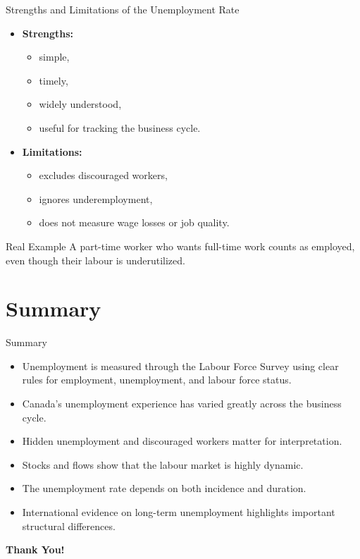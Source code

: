 \documentclass[aspectratio=169]{beamer}
\begin{document}
\begin{frame}{Strengths and Limitations of the Unemployment Rate}
\transfade
\begin{itemize}[<+->]
  \item \textbf{Strengths:}
  \begin{itemize}[<+->]
    \item simple,
    \item timely,
    \item widely understood,
    \item useful for tracking the business cycle.
  \end{itemize}
  \item \textbf{Limitations:}
  \begin{itemize}[<+->]
    \item excludes discouraged workers,
    \item ignores underemployment,
    \item does not measure wage losses or job quality.
  \end{itemize}
\end{itemize}

\begin{exampleblock}{Real Example}
A part-time worker who wants full-time work counts as employed, even though their labour is underutilized.
\end{exampleblock}
\end{frame}

\section{Summary}

\begin{frame}{Summary}
\transfade
\begin{itemize}[<+->]
  \item Unemployment is measured through the Labour Force Survey using clear rules for employment, unemployment, and labour force status.
  \item Canada's unemployment experience has varied greatly across the business cycle.
  \item Hidden unemployment and discouraged workers matter for interpretation.
  \item Stocks and flows show that the labour market is highly dynamic.
  \item The unemployment rate depends on both incidence and duration.
  \item International evidence on long-term unemployment highlights important structural differences.
\end{itemize}


\end{frame}

\begin{frame}
\centering
\Huge{\textbf{Thank You!}}
\end{frame}
\end{document}
